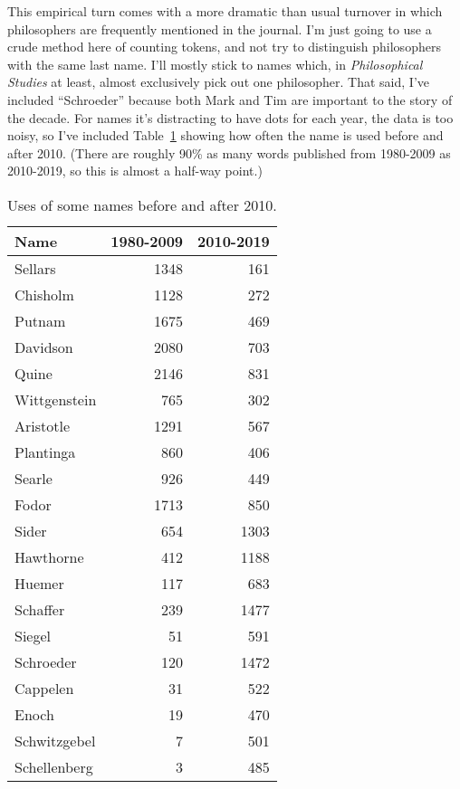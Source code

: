 \documentclass[
  10pt,
  letterpaper,
  DIV=11,
  numbers=noendperiod,
  twoside]{scrartcl}
\begin{document}
This empirical turn comes with a more dramatic than usual turnover in
which philosophers are frequently mentioned in the journal. I'm just
going to use a crude method here of counting tokens, and not try to
distinguish philosophers with the same last name. I'll mostly stick to
names which, in \emph{Philosophical Studies} at least, almost
exclusively pick out one philosopher. That said, I've included
``Schroeder'' because both Mark and Tim are important to the story of
the decade. For names it's distracting to have dots for each year, the
data is too noisy, so I've included Table~\ref{tbl-names-early-late}
showing how often the name is used before and after 2010. (There are
roughly 90\% as many words published from 1980-2009 as 2010-2019, so
this is almost a half-way point.)

\begin{longtable}[]{@{}lrr@{}}

\caption{\label{tbl-names-early-late}Uses of some names before and after
2010.}

\tabularnewline

\toprule\noalign{}
Name & 1980-2009 & 2010-2019 \\
\midrule\noalign{}
\endhead
\bottomrule\noalign{}
\endlastfoot
Sellars & 1348 & 161 \\
Chisholm & 1128 & 272 \\
Putnam & 1675 & 469 \\
Davidson & 2080 & 703 \\
Quine & 2146 & 831 \\
Wittgenstein & 765 & 302 \\
Aristotle & 1291 & 567 \\
Plantinga & 860 & 406 \\
Searle & 926 & 449 \\
Fodor & 1713 & 850 \\
Sider & 654 & 1303 \\
Hawthorne & 412 & 1188 \\
Huemer & 117 & 683 \\
Schaffer & 239 & 1477 \\
Siegel & 51 & 591 \\
Schroeder & 120 & 1472 \\
Cappelen & 31 & 522 \\
Enoch & 19 & 470 \\
Schwitzgebel & 7 & 501 \\
Schellenberg & 3 & 485 \\

\end{longtable}
\end{document}
